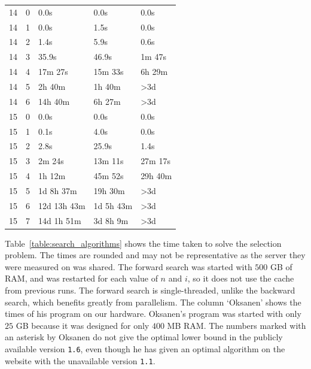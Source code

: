 \documentclass[10pt,journal,compsoc]{IEEEtran}
\begin{document}
\begin{table}[!t]
\begin{tabular}{c|c|l|l|l}
    \hline
    14         & 0          & 0.0s                    & 0.0s                     & 0.0s             \\
    14         & 1          & 0.0s                    & 1.5s                     & 0.0s             \\
    14         & 2          & 1.4s                    & 5.9s                     & 0.6s             \\
    14         & 3          & 35.9s                   & 46.9s                    & 1m 47s           \\
    14         & 4          & 17m 27s                 & 15m 33s                  & 6h 29m           \\
    14         & 5          & 2h 40m                  & 1h 40m                   & >3d              \\
    14         & 6          & 14h 40m                 & 6h 27m                   & >3d              \\
    \hline
    15         & 0          & 0.0s                    & 0.0s                     & 0.0s             \\
    15         & 1          & 0.1s                    & 4.0s                     & 0.0s             \\
    15         & 2          & 2.8s                    & 25.9s                    & 1.4s             \\
    15         & 3          & 2m 24s                  & 13m 11s                  & 27m 17s          \\
    15         & 4          & 1h 12m                  & 45m 52s                  & 29h 40m          \\
    15         & 5          & 1d 8h 37m               & 19h 30m                  & >3d              \\
    15         & 6          & 12d 13h 43m             & 1d 5h 43m                & >3d              \\
    15         & 7          & 14d 1h 51m              & 3d 8h 9m                 & >3d              \\
  \end{tabular}
\end{table}

Table~\ref{table:search_algorithms} shows the time taken to solve the selection problem.
The times are rounded and may not be representative as the server they were measured on was shared.
The forward search was started with $500$ GB of RAM, and was restarted for each value of $n$ and $i$, so it does not use the cache from previous runs.
The forward search is single-threaded, unlike the backward search, which benefits greatly from parallelism.
The column `Oksanen' shows the times of his program \cite{Oksanen} on our hardware.
Oksanen's program was started with only $25$ GB because it was designed for only $400$ MB RAM.
The numbers marked with an asterisk by Oksanen do not give the optimal lower bound in the publicly available version \texttt{1.6}, even though he has given an optimal algorithm on the website with the unavailable version \texttt{1.1}.
\end{document}
